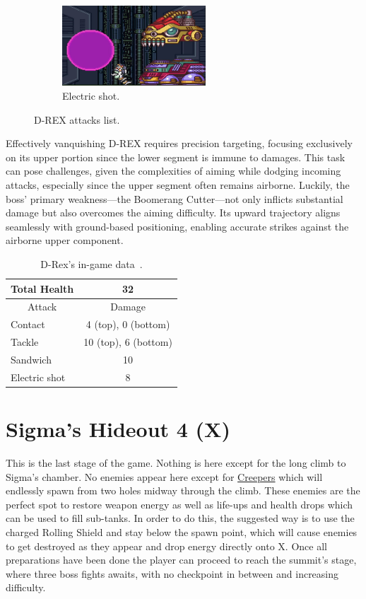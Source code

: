 \begin{figure}[htp]
\begin{subfigure}{\linewidth}
		\includegraphics[height=3cm]{figures/X1/Sigma_stages/Drex_laser_2.jpg}
		\caption{Electric shot.}
	\end{subfigure}
	\caption{D-REX attacks list.}
\end{figure} 


Effectively vanquishing D-REX requires precision targeting, focusing exclusively on its upper portion since the lower segment is immune to damages. This task can pose challenges, given the complexities of aiming while dodging incoming attacks, especially since the upper segment often remains airborne. Luckily, the boss' primary weakness—the Boomerang Cutter—not only inflicts substantial damage but also overcomes the aiming difficulty. Its upward trajectory aligns seamlessly with ground-based positioning, enabling accurate strikes against the airborne upper component.


\begin{table}[h]
	\centering
	\begin{tabular}[htp]{l c}
		\toprule
		Total Health  & 32\\
		\midrule
		\multicolumn{1}{c}{Attack} & \multicolumn{1}{c}{Damage}\\
		Contact  & 4 (top), 0 (bottom)\\
		Tackle & 10 (top), 6 (bottom)\\
		Sandwich & 10\\
		Electric shot & 8\\
		\bottomrule
	\end{tabular}
	\caption{D-Rex's in-game data~\cite{wiki:D-REX,book:Compendium}.}
\end{table}

\section{Sigma's Hideout 4 (X)}
This is the last stage of the game. Nothing  is here except for the long climb to Sigma's chamber. No enemies appear here except for \hyperlink{enem:Creeper}{Creepers} which will endlessly spawn from two holes midway through the climb. These enemies are the perfect spot to restore weapon energy as well as life-ups and health drops which can be used to fill sub-tanks. In order to do this, the suggested way is to use the charged Rolling Shield and stay below the spawn point, which will cause enemies to get destroyed as they appear and drop energy directly onto X. Once all preparations have been done the player can proceed to reach the summit's stage, where three boss fights awaits, with no checkpoint in between and increasing difficulty.

